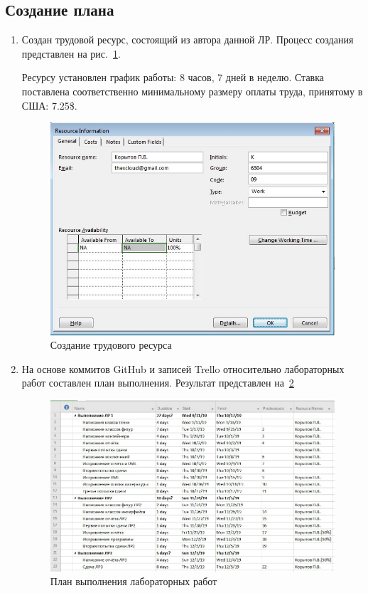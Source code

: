 \documentclass[a4paper, 14pt]{extarticle}
\begin{document}
\subsection{Создание плана}
\begin{enumerate}
    \item Создан трудовой ресурс, состоящий из автора данной ЛР. Процесс создания представлен на рис.~\ref{img:res_cr}.

    Ресурсу установлен график работы: 8 часов, 7 дней в неделю. Ставка поставлена соответственно минимальному размеру оплаты труда, принятому в США: 7.25\$.

    \begin{figure}[h]
        \centering
        \includegraphics[width=\textwidth]{img/S001.jpg}
        \caption{Создание трудового ресурса}%
        \label{img:res_cr}
    \end{figure}
    
    \item На основе коммитов GitHub и записей Trello относительно лабораторных работ составлен план выполнения. Результат представлен на~\ref{img:plan}
    \begin{figure}[h]
        \centering
        \includegraphics[width=\textwidth]{img/S002.jpg}
        \caption{План выполнения лабораторных работ}%
        \label{img:plan}
    \end{figure}
    \FloatBarrier{}
    

\end{enumerate}
\end{document}
